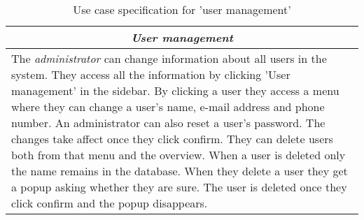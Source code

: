 \begin{table}
\centering
\begin{tabular}{p{12cm}}
\hline
\multicolumn{1}{c}{\textit{\textbf{User management}}} \\
\hline
The \textit{administrator} can change information about all users in the system.
They access all the information by clicking 'User management' in the sidebar.
By clicking a user they access a menu where they can change a user's name, e-mail address and phone number.
An administrator can also reset a user's password.
The changes take affect once they click confirm.
They can delete users both from that menu and the overview.
When a user is deleted only the name remains in the database.
When they delete a user they get a popup asking whether they are sure.
The user is deleted once they click confirm and the popup disappears.
\\\hline
\end{tabular}
\caption{Use case specification for 'user management'}\label{tab:user-management}
\end{table}
